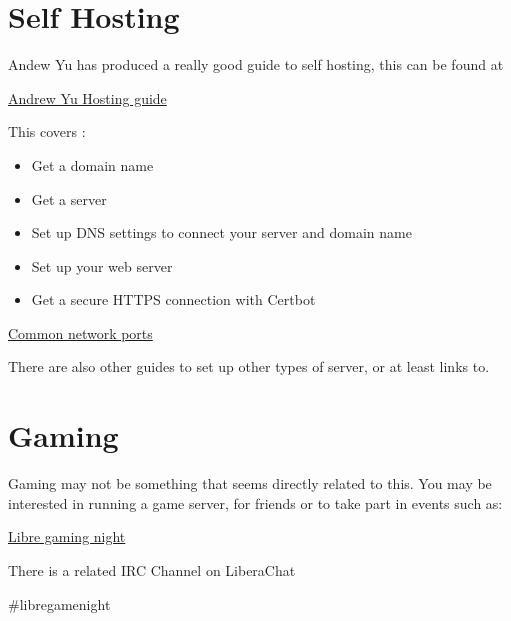 \documentclass{extbook}
\begin{document}
\section{Self Hosting}

Andew Yu has produced a really good guide to self hosting,  this can be found at

\href{https://host.andrewyu.org/}{Andrew Yu Hosting guide}

This covers :

\begin{itemize}
\item Get a domain name
\item Get a server
\item Set up DNS settings to connect your server and domain name
\item Set up your web server
\item Get a secure HTTPS connection with Certbot
\end{itemize}

\href{https://networkverge.com/common-ports/}{Common network ports}

There are also other guides to set up other types of server, or at least links to.    

\section{Gaming}

Gaming may not be something that seems directly related to this.  You may be interested in running a game server, for friends or to take part in events such as: 

\href{https://libregaming.org/}{Libre gaming night}

There is a related IRC Channel on LiberaChat 

\#libregamenight
\end{document}
